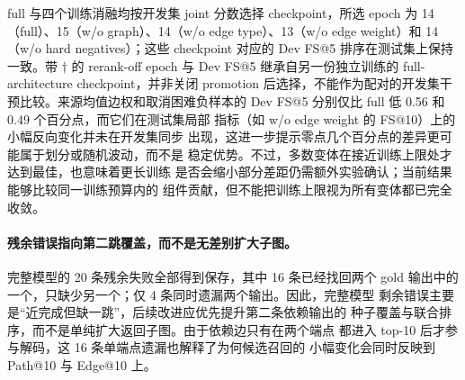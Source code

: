 \begin{table}[t]
\centering
\small
\setlength{\tabcolsep}{5pt}
\caption{EPGM R-GCN 消融的模型选择、完整覆盖与输出密度诊断。Dev
FS@5 的单位为百分比，其余完整/未完整列的分母为 2,851。
$^{\dagger}$该 epoch 与 Dev FS@5 继承自交付的 rerank-off 行所使用的另一份
full-architecture checkpoint。}
\label{tab:provenance-ablation-diagnostics}
\end{table}

full 与四个训练消融均按开发集 joint 分数选择 checkpoint，所选 epoch 为
14（full）、15（w/o graph）、14（w/o edge type）、13（w/o edge
weight）和 14（w/o hard negatives）；这些 checkpoint 对应的 Dev FS@5
排序在测试集上保持一致。带 $\dagger$ 的 rerank-off epoch 与 Dev FS@5
继承自另一份独立训练的 full-architecture checkpoint，并非关闭 promotion
后选择，不能作为配对的开发集干预比较。来源均值边权和取消困难负样本的
Dev FS@5 分别仅比 full 低 0.56 和 0.49 个百分点，而它们在测试集局部
指标（如 w/o edge weight 的 FS@10）上的小幅反向变化并未在开发集同步
出现，这进一步提示零点几个百分点的差异更可能属于划分或随机波动，而不是
稳定优势。不过，多数变体在接近训练上限处才达到最佳，也意味着更长训练
是否会缩小部分差距仍需额外实验确认；当前结果能够比较同一训练预算内的
组件贡献，但不能把训练上限视为所有变体都已完全收敛。

\paragraph{残余错误指向第二跳覆盖，而不是无差别扩大子图。}
完整模型的 20 条残余失败全部得到保存，其中 16 条已经找回两个 gold
输出中的一个，只缺少另一个；仅 4 条同时遗漏两个输出。因此，完整模型
剩余错误主要是“近完成但缺一跳”，后续改进应优先提升第二条依赖输出的
种子覆盖与联合排序，而不是单纯扩大返回子图。由于依赖边只有在两个端点
都进入 top-10 后才参与解码，这 16 条单端点遗漏也解释了为何候选召回的
小幅变化会同时反映到 Path@10 与 Edge@10 上。

